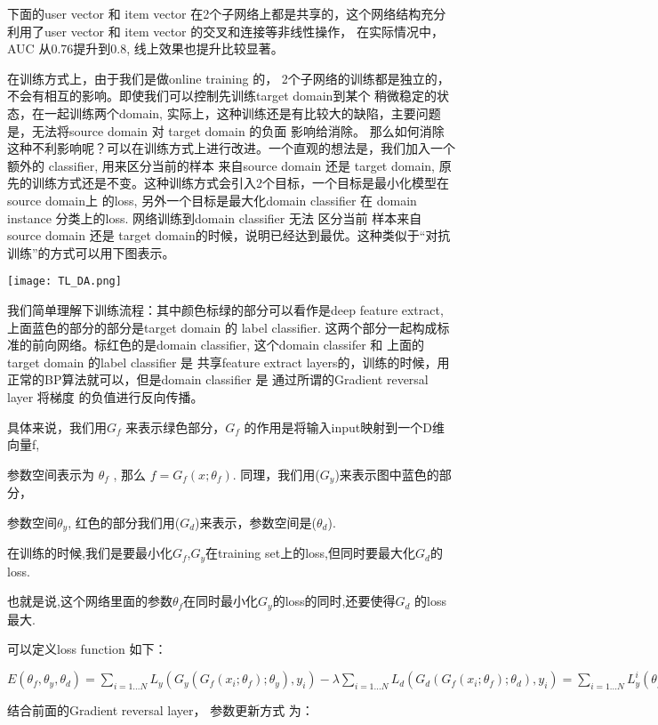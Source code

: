 下面的user vector 和 item vector 在2个子网络上都是共享的，这个网络结构充分利用了user vector 和 item vector 的交叉和连接等非线性操作，
在实际情况中，AUC 从0.76提升到0.8, 线上效果也提升比较显著。


在训练方式上，由于我们是做online training 的， 2个子网络的训练都是独立的，不会有相互的影响。即使我们可以控制先训练target domain到某个
稍微稳定的状态，在一起训练两个domain, 实际上，这种训练还是有比较大的缺陷，主要问题是，无法将source domain 对 target domain 的负面
影响给消除。 那么如何消除这种不利影响呢？可以在训练方式上进行改进。一个直观的想法是，我们加入一个额外的 classifier, 用来区分当前的样本
来自source domain 还是 target domain, 原先的训练方式还是不变。这种训练方式会引入2个目标，一个目标是最小化模型在source domain上
的loss, 另外一个目标是最大化domain classifier 在 domain instance 分类上的loss. 网络训练到domain classifier 无法 区分当前
样本来自source domain 还是 target domain的时候，说明已经达到最优。这种类似于“对抗训练”的方式可以用下图表示。

\texttt{[image: TL\_DA.png]}

我们简单理解下训练流程：其中颜色标绿的部分可以看作是deep feature extract, 上面蓝色的部分的部分是target domain 的 label classifier.
这两个部分一起构成标准的前向网络。标红色的是domain classifier, 这个domain classifer 和 上面的target domain 的label classifier 是
共享feature extract layers的，训练的时候，用正常的BP算法就可以，但是domain classifier 是 通过所谓的Gradient reversal layer 将梯度
的负值进行反向传播。

具体来说，我们用$G_f$ 来表示绿色部分，$G_f$ 的作用是将输入input映射到一个D维向量f,

参数空间表示为 $\theta_f$ , 那么 $f= G_f(x;\theta_f)$. 同理，我们用($G_y$)来表示图中蓝色的部分，

参数空间$\theta_y$, 红色的部分我们用($G_d$)来表示，参数空间是($\theta_d$).

在训练的时候,我们是要最小化$G_f$,$G_y$在training set上的loss,但同时要最大化$G_d$的loss.

也就是说,这个网络里面的参数$\theta_f$在同时最小化$G_y$的loss的同时,还要使得$G_d$ 的loss最大.

可以定义loss function 如下：

$E(\theta_f, \theta_y, \theta_d) = \sum_{i=1...N}{L_y(G_y(G_f(x_i;\theta_f);\theta_y),y_i)} - \lambda\sum_{i=1...N}{L_d(G_d(G_f(x_i;\theta_f);\theta_d),y_i)} = \sum_{i=1...N}{L_y^i(\theta_f,\theta_y)} - \lambda\sum_{i=1...N}{L_d^i(\theta_f,\theta_d)}$


结合前面的Gradient reversal layer， 参数更新方式 为：



